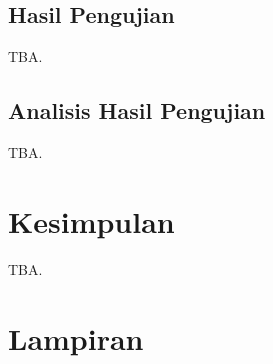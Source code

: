 \subsection{Hasil Pengujian}

TBA.



\subsection{Analisis Hasil Pengujian}

TBA.
 
   
   
\section{Kesimpulan}

TBA.
 





\section*{Lampiran}

